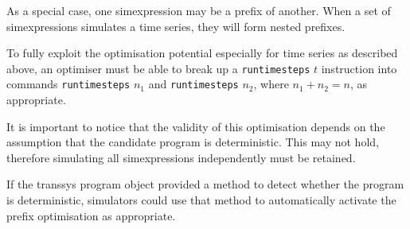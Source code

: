 \documentclass[a4paper,fleqn]{article}
\newcommand{\computercode}[1]{\texttt{#1}}
\begin{document}
As a special case, one simexpression may be a prefix of another.
When a set of simexpressions simulates a time series, they will form
nested prefixes.

To fully exploit the optimisation potential especially for time series
as described above, an optimiser must be able to break up a
\computercode{runtimesteps} $t$ instruction into commands
\computercode{runtimesteps} $n_1$ and \computercode{runtimesteps}
$n_2$, where $n_1 + n_2 = n$, as appropriate.

It is important to notice that the validity of this optimisation
depends on the assumption that the candidate program is
deterministic. This may not hold, therefore simulating all
simexpressions independently must be retained.

If the transsys program object provided a method to detect whether
the program is deterministic, simulators could use that method to
automatically activate the prefix optimisation as appropriate.
\end{document}
